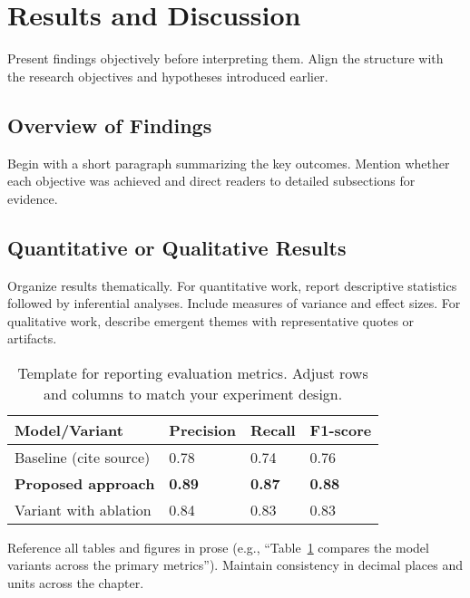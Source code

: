 \section{Results and Discussion}
\label{sec:results-discussion}

\noindent Present findings objectively before interpreting them. Align the
structure with the research objectives and hypotheses introduced earlier.

\subsection{Overview of Findings}
Begin with a short paragraph summarizing the key outcomes. Mention whether each
objective was achieved and direct readers to detailed subsections for evidence.

\subsection{Quantitative or Qualitative Results}
Organize results thematically. For quantitative work, report descriptive
statistics followed by inferential analyses. Include measures of variance and
effect sizes. For qualitative work, describe emergent themes with
representative quotes or artifacts.

\begin{table}[H]
    \centering
    \caption{Template for reporting evaluation metrics. Adjust rows and columns to
        match your experiment design.}\label{tab:evaluation}
    \begin{tabular}{p{4cm}p{2cm}p{2cm}p{2cm}}
        \hline
        Model/Variant              & Precision     & Recall        & F1-score      \\
        \hline
        Baseline (cite source)     & 0.78          & 0.74          & 0.76          \\
        \textbf{Proposed approach} & \textbf{0.89} & \textbf{0.87} & \textbf{0.88} \\
        Variant with ablation      & 0.84          & 0.83          & 0.83          \\
        \hline
    \end{tabular}
\end{table}

\noindent Reference all tables and figures in prose (e.g.,
``Table~\ref{tab:evaluation} compares the model variants across the primary
metrics''). Maintain consistency in decimal places and units across the chapter.

